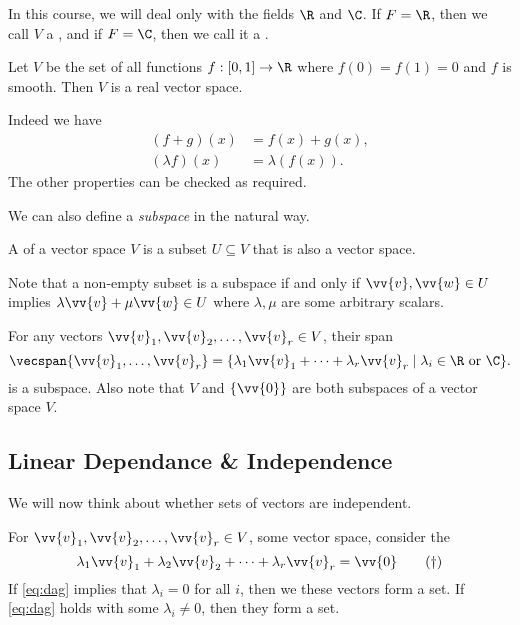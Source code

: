 In this course, we will deal only with the fields $\R$ and $\C$. If $F = \R$, then we call $V$ a , and if $F = \C$, then we call it a .

\begin{example}
  Let $V$ be the set of all functions $f: [0, 1] \rightarrow \R$ where $f(0) = f(1) = 0$ and $f$ is smooth. Then $V$ is a real vector space.

  Indeed we have
  \begin{align*}
      (f + g)(x) &= f(x) + g(x), \\
      (\lambda f)(x) &= \lambda (f(x)).
  \end{align*}
  The other properties can be checked as required.
\end{example}

We can also define a \emph{subspace} in the natural way.

\begin{definition}[Subspace]
    A  of a vector space $V$ is a subset $U \subseteq V$ that is also a vector space.
\end{definition}

Note that a non-empty subset is a subspace if and only if $\vv{v}, \vv{w} \in U$ implies $\lambda \vv{v} + \mu \vv{w} \in U$ where $\lambda, \mu$ are some arbitrary scalars.

For any vectors $\vv{v}_1, \vv{v}_2, \dots, \vv{v}_r \in V$, their span
$$
    \vecspan \{\vv{v}_1, \dots, \vv{v}_r\} = \{ \lambda_1 \vv{v}_1 + \cdots + \lambda_r \vv{v}_r \mid \lambda_i \in \R \text{ or } \C \}.
$$
is a subspace. Also note that $V$ and $\{ \vv{0} \}$ are both subspaces of a vector space $V$.

\subsection{Linear Dependance \& Independence}

We will now think about whether sets of vectors are independent. 

\begin{definition}
    For $\vv{v}_1, \vv{v}_2, \dots, \vv{v}_r \in V$, some vector space, consider the 
    \begin{equation}\label{eq:dag}
        \lambda_1 \vv{v}_1 + \lambda_2 \vv{v}_2 + \cdots + \lambda_r \vv{v}_r = \vv{0} \tag{$\dagger$}
    \end{equation}
    If \eqref{eq:dag} implies that $\lambda_i = 0$ for all $i$, then we these vectors form a  set. If \eqref{eq:dag} holds with some $\lambda_i \neq 0$, then they form a  set.
\end{definition}


